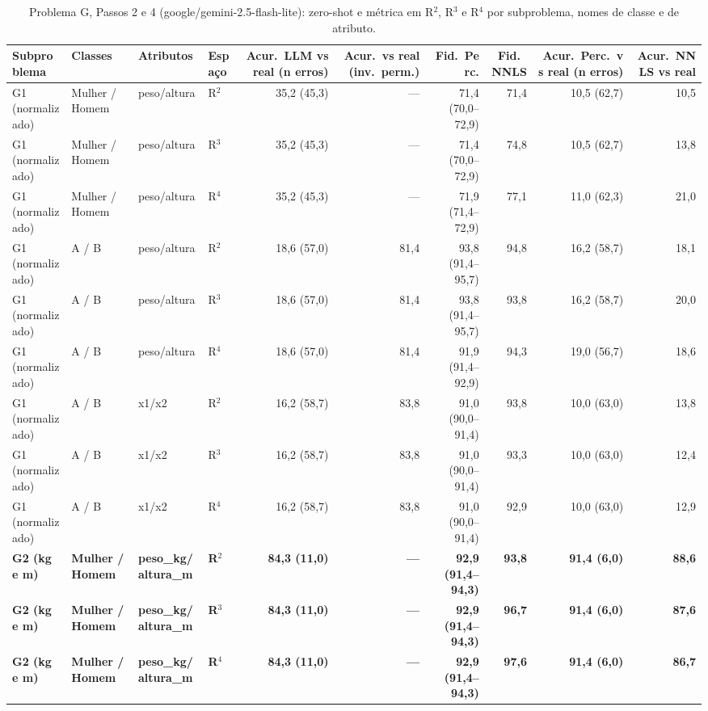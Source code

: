 \begin{table}[htbp]
\centering
\footnotesize
\caption{Problema G, Passos 2 e 4 (google/gemini-2.5-flash-lite): zero-shot e métrica em R$^2$, R$^3$ e R$^4$ por subproblema, nomes de classe e de atributo.}
\label{tab:bloco3_G_passos_2_e_4_R2_R3_R4_flashlite}
\begin{tabular}{llllrrrrrr}
\toprule
Subproblema & Classes & Atributos & Espaço & Acur.\ LLM vs real (n erros) & Acur.\ vs real (inv.\ perm.) & Fid.\ Perc. & Fid.\ NNLS & Acur.\ Perc.\ vs real (n erros) & Acur.\ NNLS vs real \\
\midrule
G1 (normalizado) & Mulher / Homem & peso/altura & R$^2$ & 35,2 (45,3) & — & 71,4 (70,0–72,9) & 71,4 & 10,5 (62,7) & 10,5 \\
G1 (normalizado) & Mulher / Homem & peso/altura & R$^3$ & 35,2 (45,3) & — & 71,4 (70,0–72,9) & 74,8 & 10,5 (62,7) & 13,8 \\
G1 (normalizado) & Mulher / Homem & peso/altura & R$^4$ & 35,2 (45,3) & — & 71,9 (71,4–72,9) & 77,1 & 11,0 (62,3) & 21,0 \\
\midrule
G1 (normalizado) & A / B & peso/altura & R$^2$ & 18,6 (57,0) & 81,4 & 93,8 (91,4–95,7) & 94,8 & 16,2 (58,7) & 18,1 \\
G1 (normalizado) & A / B & peso/altura & R$^3$ & 18,6 (57,0) & 81,4 & 93,8 (91,4–95,7) & 93,8 & 16,2 (58,7) & 20,0 \\
G1 (normalizado) & A / B & peso/altura & R$^4$ & 18,6 (57,0) & 81,4 & 91,9 (91,4–92,9) & 94,3 & 19,0 (56,7) & 18,6 \\
\midrule
G1 (normalizado) & A / B & x1/x2 & R$^2$ & 16,2 (58,7) & 83,8 & 91,0 (90,0–91,4) & 93,8 & 10,0 (63,0) & 13,8 \\
G1 (normalizado) & A / B & x1/x2 & R$^3$ & 16,2 (58,7) & 83,8 & 91,0 (90,0–91,4) & 93,3 & 10,0 (63,0) & 12,4 \\
G1 (normalizado) & A / B & x1/x2 & R$^4$ & 16,2 (58,7) & 83,8 & 91,0 (90,0–91,4) & 92,9 & 10,0 (63,0) & 12,9 \\
\midrule
\textbf{G2 (kg e m)} & \textbf{Mulher / Homem} & \textbf{peso\_kg/altura\_m} & \textbf{R$^2$} & \textbf{84,3 (11,0)} & \textbf{—} & \textbf{92,9 (91,4–94,3)} & \textbf{93,8} & \textbf{91,4 (6,0)} & \textbf{88,6} \\
\textbf{G2 (kg e m)} & \textbf{Mulher / Homem} & \textbf{peso\_kg/altura\_m} & \textbf{R$^3$} & \textbf{84,3 (11,0)} & \textbf{—} & \textbf{92,9 (91,4–94,3)} & \textbf{96,7} & \textbf{91,4 (6,0)} & \textbf{87,6} \\
\textbf{G2 (kg e m)} & \textbf{Mulher / Homem} & \textbf{peso\_kg/altura\_m} & \textbf{R$^4$} & \textbf{84,3 (11,0)} & \textbf{—} & \textbf{92,9 (91,4–94,3)} & \textbf{97,6} & \textbf{91,4 (6,0)} & \textbf{86,7} \\

\end{tabular}
\end{table}
